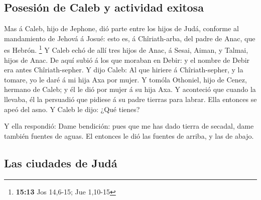 \hypertarget{posesiuxf3n-de-caleb-y-actividad-exitosa}{%
\subsection{Posesión de Caleb y actividad
exitosa}\label{posesiuxf3n-de-caleb-y-actividad-exitosa}}

 Mas á Caleb, hijo de Jephone, dió parte entre los hijos de
Judá, conforme al mandamiento de Jehová á Josué: esto es, á
Chîriath-arba, del padre de Anac, que es Hebrón. \footnote{\textbf{15:13}
  Jos 14,6-15; Jue 1,10-15}  Y Caleb echó de allí tres
hijos de Anac, á Sesai, Aiman, y Talmai, hijos de Anac.  De
aquí subió á los que moraban en Debir: y el nombre de Debir era antes
Chîriath-sepher.  Y dijo Caleb: Al que hiriere á
Chîriath-sepher, y la tomare, yo le daré á mi hija Axa por mujer.
 Y tomóla Othoniel, hijo de Cenez, hermano de Caleb; y él
le dió por mujer á su hija Axa.  Y aconteció que cuando la
llevaba, él la persuadió que pidiese á su padre tierras para labrar.
Ella entonces se apeó del asno. Y Caleb le dijo: ¿Qué tienes?

 Y ella respondió: Dame bendición: pues que me has dado
tierra de secadal, dame también fuentes de aguas. El entonces le dió las
fuentes de arriba, y las de abajo.

\hypertarget{las-ciudades-de-juduxe1}{%
\subsection{Las ciudades de Judá}\label{las-ciudades-de-juduxe1}}

